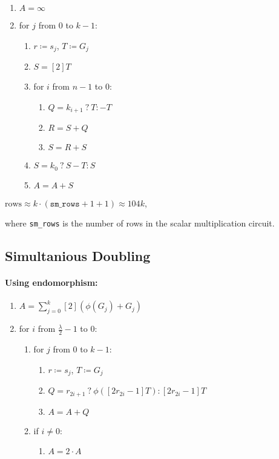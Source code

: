 \begin{enumerate}
	\item $A = \infty$
	\item for $j$ from $0$ to $k-1$:
	\begin{enumerate}
		\item $r \coloneqq s_j$, $T \coloneqq G_j$
		\item $S = [2]T$
		\item for $i$ from $n - 1$ to $0$:
		\begin{enumerate}
			\item $Q = k_{i + 1} \: ? \: T : -T$
			\item $R = S + Q$
			\item $S = R + S$
		\end{enumerate}
		\item $S = k_0 \: ? \: S - T : S$
		\item $A = A + S$
	\end{enumerate}
\end{enumerate}


\begin{center}
	$\text{rows} \approx k \cdot (\texttt{sm\_rows} + 1 + 1) \approx 104k$,
\end{center}
where \texttt{sm\_rows} is the number of rows in the scalar multiplication circuit. 

\subsection{Simultanious Doubling}
\paragraph{Using endomorphism:} 

\begin{enumerate}
	\item $A = \sum\limits_{j = 0}^{k} [2](\phi(G_j) + G_j)$
	\item for $i$ from $\frac{\lambda}{2} - 1$ to $0$:
	\begin{enumerate}
		\item for $j$ from $0$ to $k-1$:
		\begin{enumerate}
			\item $r \coloneqq s_j$, $T \coloneqq G_j$
			\item $Q = r_{2i + 1} \: ? \: \phi([2r_{2i} - 1]T) : [2r_{2i} - 1]T$
			\item $A = A + Q$
		\end{enumerate}
		\item if $i \neq 0$:
		\begin{enumerate}
			\item $A = 2 \cdot A$
		\end{enumerate}
	\end{enumerate}
\end{enumerate}

